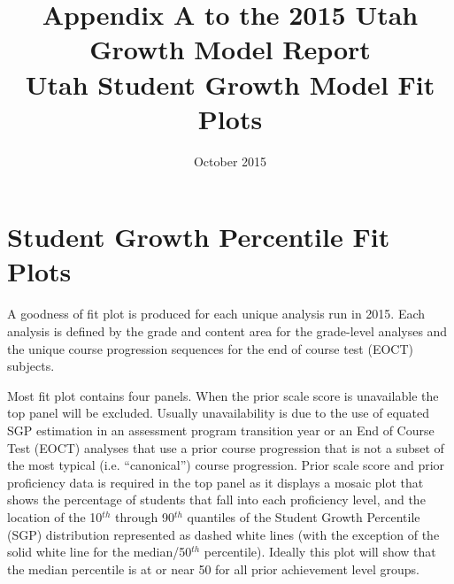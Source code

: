 \documentclass[12pt]{article}
\begin{document}
\title{\textsf{\LARGE Appendix A to the 2015 Utah Growth Model Report  \\\medskip Utah Student Growth Model Fit Plots }}
\author{}

 \date{October 2015} 

\maketitle

\newpage


\section{Student Growth Percentile Fit
Plots}\label{student-growth-percentile-fit-plots}

A goodness of fit plot is produced for each unique analysis run in 2015.
Each analysis is defined by the grade and content area for the
grade-level analyses and the unique course progression sequences for the
end of course test (EOCT) subjects.

Most fit plot contains four panels. When the prior scale score is
unavailable the top panel will be excluded. Usually unavailability is
due to the use of equated SGP estimation in an assessment program
transition year or an End of Course Test (EOCT) analyses that use a
prior course progression that is not a subset of the most typical (i.e.
``canonical'') course progression. Prior scale score and prior
proficiency data is required in the top panel as it displays a mosaic
plot that shows the percentage of students that fall into each
proficiency level, and the location of the 10\(^{th}\) through
90\(^{th}\) quantiles of the Student Growth Percentile (SGP)
distribution represented as dashed white lines (with the exception of
the solid white line for the median/50\(^{th}\) percentile). Ideally
this plot will show that the median percentile is at or near 50 for all
prior achievement level groups.
\end{document}
